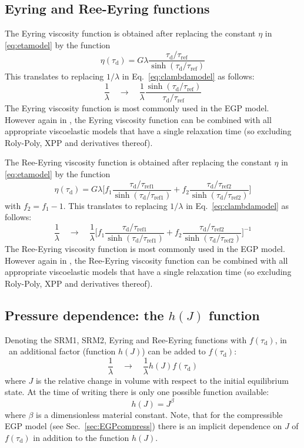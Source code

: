 \subsection{Eyring and Ree-Eyring functions}
The Eyring viscosity function is obtained after replacing the constant $\eta$ in \eqref{eq:etamodel} by the function
\[
    \eta(\tau_\text{d})=G\lambda \dfrac{\tau_\text{d}/\tau_\text{ref}}{\sinh{(\tau_\text{d}/\tau_\text{ref})}}
\]
This translates to replacing $1/\lambda$ in Eq.~\eqref{eq:clambdamodel} as follows:
\begin{equation}
    \dfrac1\lambda \quad\rightarrow\quad 
       \dfrac1\lambda \dfrac{\sinh{(\tau_\text{d}/\tau_\text{ref})}}{\tau_\text{d}/\tau_\text{ref}}
\end{equation}
The Eyring viscosity function is most commonly used in the EGP model. However again
in \tfem, the Eyring viscosity function can be combined with all appropriate viscoelastic models that have a single relaxation time (so excluding Roly-Poly, XPP and derivatives thereof).

The Ree-Eyring viscosity function is obtained after replacing the constant $\eta$ in \eqref{eq:etamodel} by the  function
\[
    \eta(\tau_\text{d})=G\lambda \Big[f_1\dfrac{\tau_\text{d}/\tau_\text{ref1}}{\sinh{(\tau_\text{d}/\tau_\text{ref1})}}+
    f_2\dfrac{\tau_\text{d}/\tau_\text{ref2}}{\sinh{(\tau_\text{d}/\tau_\text{ref2})}} \Big]
\]
with $f_2=f_1-1$.
This translates to replacing $1/\lambda$ in Eq.~\eqref{eq:clambdamodel} as follows:
\begin{equation}
    \dfrac1\lambda \quad\rightarrow\quad 
       \dfrac1\lambda \Big[f_1\dfrac{\tau_\text{d}/\tau_\text{ref1}}{\sinh{(\tau_\text{d}/\tau_\text{ref1})}}+
    f_2\dfrac{\tau_\text{d}/\tau_\text{ref2}}{\sinh{(\tau_\text{d}/\tau_\text{ref2})}} \Big]^{-1}
\end{equation}
The Ree-Eyring viscosity function is most commonly used in the EGP model. However again
in \tfem, the Ree-Eyring viscosity function can be combined with all appropriate viscoelastic models that have a single relaxation time (so excluding Roly-Poly, XPP and derivatives thereof).

\subsection{Pressure dependence: the $h(J)$ function}
\label{sec:pressuredependenthJ}
Denoting the SRM1, SRM2, Eyring and Ree-Eyring functions with $f(\tau_\text{d})$, in \tfem\ an additional factor (function $h(J)$) can be added to $f(\tau_\text{d})$:
\begin{equation}
    \dfrac1\lambda \quad\rightarrow\quad 
       \dfrac1\lambda h(J) f(\tau_\text{d})
\end{equation}
where $J$ is the relative change in volume with respect to the initial equilibrium state. At the time of writing there is only one possible function available:
\begin{equation}
   h(J) = J^\beta
\end{equation}
where $\beta$ is a dimensionless material constant. Note, that for the compressible EGP model (see Sec.~\ref{sec:EGPcompress}) there is an implicit dependence on $J$ of $f(\tau_\text{d})$ in addition to the function $h(J)$.

